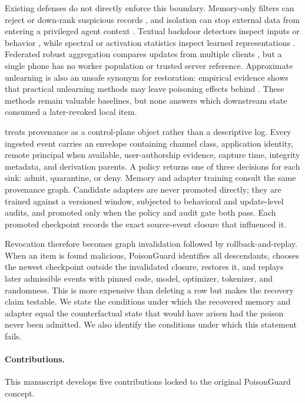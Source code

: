 Existing defenses do not directly enforce this boundary. Memory-only filters can reject or down-rank suspicious records \cite{sunil2026memorypoison,wei2025amemguard}, and isolation can stop external data from entering a privileged agent context \cite{wen2026agentsys}. Textual backdoor detectors inspect inputs or behavior \cite{qi2020onion,yang2021rap}, while spectral or activation statistics inspect learned representations \cite{tran2018spectral,chen2018activation}. Federated robust aggregation compares updates from multiple clients \cite{blanchard2017krum,yin2018byzantine,pillutla2019rfa,cao2020fltrust}, but a single phone has no worker population or trusted server reference. Approximate unlearning is also an unsafe synonym for restoration: empirical evidence shows that practical unlearning methods may leave poisoning effects behind \cite{pawelczyk2025unlearning}. These methods remain valuable baselines, but none answers which downstream state consumed a later-revoked local item.

\PG treats provenance as a control-plane object rather than a descriptive log. Every ingested event carries an envelope containing channel class, application identity, remote principal when available, user-authorship evidence, capture time, integrity metadata, and derivation parents. A policy returns one of three decisions for each sink: admit, quarantine, or deny. Memory and adapter training consult the same provenance graph. Candidate adapters are never promoted directly; they are trained against a versioned window, subjected to behavioral and update-level audits, and promoted only when the policy and audit gate both pass. Each promoted checkpoint records the exact source-event closure that influenced it.

Revocation therefore becomes graph invalidation followed by rollback-and-replay. When an item is found malicious, PoisonGuard identifies all descendants, chooses the newest checkpoint outside the invalidated closure, restores it, and replays later admissible events with pinned code, model, optimizer, tokenizer, and randomness. This is more expensive than deleting a row but makes the recovery claim testable. We state the conditions under which the recovered memory and adapter equal the counterfactual state that would have arisen had the poison never been admitted. We also identify the conditions under which this statement fails.

\paragraph{Contributions.} This manuscript develops five contributions locked to the original PoisonGuard concept.

